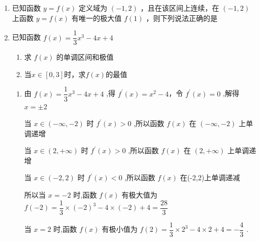 \begin{enumerate}
\begin{jieda}
        当 $h \in  \left( {2\sqrt{3},6}\right)$ 时, ${V}^{\prime }\left( h\right)  < 0,V\left( h\right)$ 单调递减
        
        所以 $V\left( h\right)$ 在 $h = 2\sqrt{3}$ 时取得最大值.
    \end{jieda}
    
    \item 已知函数 $y = f\left( x\right)$ 定义域为 $\left( {-1,2}\right)$ ，且在该区间上连续，在 $\left( {-1,2}\right)$ 上函数 $y = f\left( x\right)$ 有唯一的极大值 $f\left( 1\right)$ ，则下列说法正确的是
    
    \item 已知函数 $f\left( x\right)  = \dfrac{1}{3}{x}^{3} - {4x} + 4$
    \begin{enumerate}
        \item 求 $f\left( x\right)$ 的单调区间和极值
        \item 当$x \in [0, 3]$时，求$f(x)$的最值
    \end{enumerate}
    \begin{jieda}
        \begin{enumerate}
            \item 由 $f\left( x\right)  = \dfrac{1}{3}{x}^{3} - {4x} + 4$ ,得 ${f}^{\prime }\left( x\right)  = {x}^{2} - 4$，令 ${f}^{\prime }\left( x\right)  = 0$ ,解得 $x =  \pm  2$
            
            当 $x \in  \left( {-\infty , - 2}\right)$ 时 ${f}^{\prime }\left( x\right)  > 0$ ,所以函数 $f\left( x\right)$ 在 $\left( {-\infty , - 2}\right)$ 上单调递增
            
            当 $x \in  \left( {2, + \infty }\right)$ 时 ${f}^{\prime }\left( x\right)  > 0$ ,所以函数 $f\left( x\right)$ 在 $\left( {2, + \infty }\right)$ 上单调递增
            
            当 $x \in  \left( {-2,2}\right)$ 时 ${f}^{\prime }\left( x\right)  < 0$ ,所以函数 $f\left( x\right)$ 在(-2,2)上单调递减
            
            所以当 $x =  - 2$ 时,函数 $f\left( x\right)$ 有极大值为 $f\left( {-2}\right)  = \dfrac{1}{3} \times  {\left( -2\right) }^{3} - 4 \times  \left( {-2}\right)  + 4 = \dfrac{28}{3}$ 
            
            当 $x = 2$ 时,函数 $f\left( x\right)$ 有极小值为 $f\left( 2\right)  = \dfrac{1}{3} \times  {2}^{3} - 4 \times  2 + 4 =  - \dfrac{4}{3}$ .
            

\end{enumerate}
\end{jieda}
\end{enumerate}
